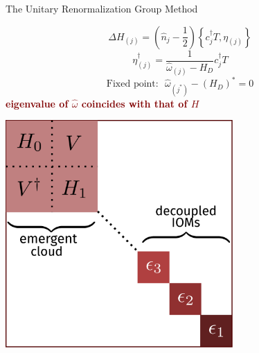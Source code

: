 \documentclass[aspectratio=169]{beamer}
\newcommand{\focus}[1]{\textcolor{maroon}{\textbf{#1}}}
\begin{document}
\begin{frame}[noframenumbering]{The Unitary Renormalization Group Method}
{\vspace*{40pt}
\begin{minipage}{0.4\textwidth}
	\centering
\[ \Delta H_{(j)} = \left(\hat n_j - \frac{1}{2}\right) \left\{c^\dagger_j T, \eta_{(j)}\right\} \]
\[\eta^\dagger_{(j)} = \frac{1}{\hat \omega_{(j)} - H_D}c^\dagger_j T\] 
\[\text{{Fixed point:}}~ ~ ~\hat \omega_{(j^*)} - \left(H_D\right)^* = 0\]
\focus{eigenvalue of \(\hat \omega\) coincides with that of \(H\)}
\end{minipage}
\hspace*{\fill}
\begin{minipage}{0.58\textwidth}
	\centering
	\includegraphics[width=0.65\textwidth]{figures/urg_ham_full.pdf}
\end{minipage}
\vspace*{\fill}
}
\end{frame}
\end{document}

